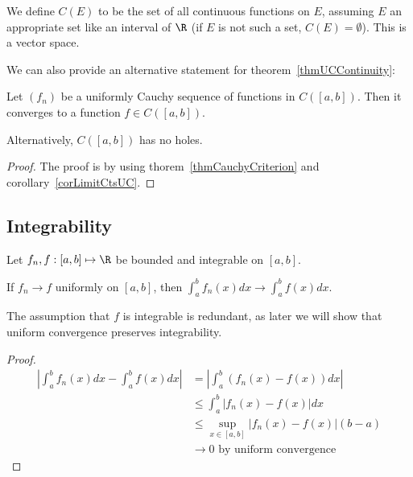 \documentclass[../Main.tex]{subfiles}
\begin{document}
\begin{remark}
    We define $C(E)$ to be the set of all continuous functions on $E$, assuming $E$ an appropriate set like an interval of $\R$ (if $E$ is not such a set, $C(E) = \emptyset$). This is a vector space.
\end{remark}
We can also provide an alternative statement for theorem~\ref{thmUCContinuity}:
\begin{corollary}
    Let $(f_n)$ be a uniformly Cauchy sequence of functions in $C([a, b])$. Then it converges to a function $f \in C([a, b])$.
    \label{corUCauchyCts}
\end{corollary}
Alternatively, $C([a, b])$ has no holes.
\begin{proof}
    The proof is by using thorem~\ref{thmCauchyCriterion} and corollary~\ref{corLimitCtsUC}.
\end{proof}
\subsection{Integrability} %
\begin{theorem}
    Let $f_n, f : [a, b] \mapsto \R$ be bounded and integrable on $[a, b]$.

    If $f_n \to f$ uniformly on $[a, b]$, then $\int_{a}^{b} f_n(x) dx \to \int_{a}^{b} f(x) dx$.
    \label{thmUCIntegrals}
\end{theorem}
\begin{remark}
    The assumption that $f$ is integrable is redundant, as later we will show that uniform convergence preserves integrability.
\end{remark}
\begin{proof}
    \begin{align*}
        \left|\int_{a}^{b} f_n(x) dx - \int_{a}^{b} f(x) dx\right| &= \left|\int_{a}^{b} (f_n(x) - f(x)) dx\right| \\
        &\leq \int_{a}^{b} |f_n(x) - f(x)| dx \\
        &\leq \sup_{x \in [a, b]} |f_n(x) - f(x)|(b - a) \\
        &\to 0 \text{ by uniform convergence}
    \end{align*}
\end{proof}
\end{document}
